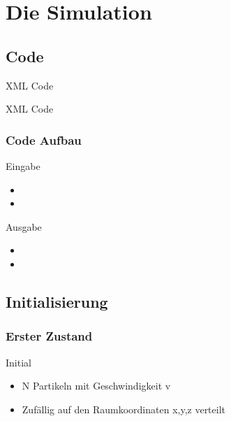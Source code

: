 \documentclass[11pt]{beamer}
\begin{document}
\section{Die Simulation}

\subsection{Code}

  \vspace*{-0.3cm}
  \begin{center}
   XML Code
  \end{center}


  \vspace*{-0.3cm}
  \begin{center}
   XML Code
  \end{center}


\begin{frame}
\frametitle{Code Aufbau}
  \vspace*{-0.3cm}
  \begin{block}{Eingabe}
  \begin{itemize}
      \item 
      \item 
    \end{itemize}
  \end{block}
  \pause
    \begin{block}{Ausgabe}
  \begin{itemize}
      \item 
      \item 
    \end{itemize}
  \end{block}
\end{frame}

\subsection{Initialisierung}

\begin{frame}
\frametitle{Erster Zustand}
  \vspace*{-0.3cm}
  \begin{block}{Initial}
    \begin{itemize}
      \item N Partikeln mit Geschwindigkeit v
      \item Zufällig auf den Raumkoordinaten x,y,z verteilt
    \end{itemize}
  \end{block}
\end{frame}
\end{document}
